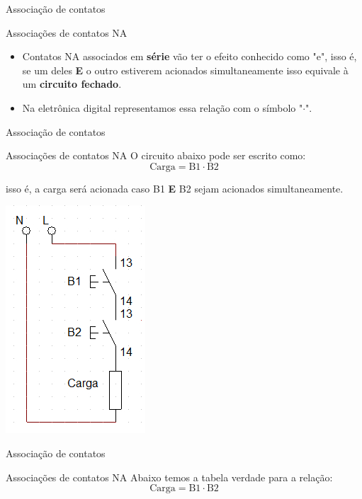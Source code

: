 \begin{frame}{Associação de contatos}
\begin{block}{Associações de contatos NA}
\begin{itemize}
    \item Contatos NA associados em \textbf{série} vão ter o efeito conhecido como "e", isso é, se um deles \textbf{E} o outro estiverem acionados simultaneamente isso equivale à um \textbf{circuito fechado}.
    \item Na eletrônica digital representamos essa relação com o símbolo "$ \cdot $".
\end{itemize}
\end{block}
\end{frame}

\begin{frame}{Associação de contatos}
\begin{block}{Associações de contatos NA}
	O circuito abaixo pode ser escrito como:
	$$ \text{Carga} = \text{B}1\cdot \text{B}2 $$
	
	 isso é, a carga será acionada caso B1 \textbf{E} B2 sejam acionados simultaneamente.
\end{block}

\centerline{\includegraphics[height=0.5\textheight]{Figuras/Ch06/fig5.jpg}}
\end{frame}

\begin{frame}{Associação de contatos}
\begin{block}{Associações de contatos NA}
	Abaixo temos a tabela verdade para a relação:
	$$ \text{Carga} = \text{B}1\cdot \text{B}2 $$
\end{block}

\vspace{0.3cm}

\begin{table}[h]
\end{table}
\end{frame}



